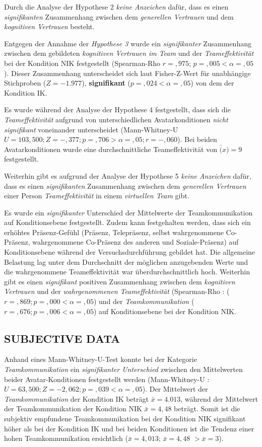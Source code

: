 \documentclass[sigchi]{acmart}
\begin{document}
Durch die Analyse der Hypothese 2 \textit{keine Anzeichen} dafür, dass es einen \textit{signifikanten} Zusammenhang zwischen dem \textit{generellen Vertrauen} und dem \textit{kognitiven Vertrauen} besteht. 

Entgegen der Annahme der \textit{Hypothese 3} wurde ein \textit{signifikanter} Zusammenhang zwischen dem gebildeten \textit{kognitiven Vertrauen im Team} und der \textit{Teameffektivität} bei der Kondition NIK festgestellt (Spearman-Rho $r =,975$; $p =,005 < \alpha = ,05$). Dieser Zusammenhang unterscheidet sich laut Fisher-Z-Wert für unabhängige Stichproben ($Z=-1.977$), \textbf{signifikant} ($p =,024 < \alpha = ,05$) von dem der Kondition IK.
 
Es wurde während der Analyse der Hypothese 4 festgestellt, dass sich die \textit{Teameffektivität} aufgrund von unterschiedlichen Avatarkonditionen \textit{nicht signifikant} voneinander unterscheidet (Mann-Whitney-U $U = 103,500; Z = -,377; p =,706 > \alpha = ,05; r = -,060$). Bei beiden Avatarkonditionen wurde eine durchschnittliche Teameffektivität von $\bar(x) = 9$ festgestellt.

Weiterhin gibt es aufgrund der Analyse der Hypothese 5 \textit{keine Anzeichen} dafür, dass es einen \textit{signifikanten} Zusammenhang zwischen dem \textit{generellen Vertrauen} einer Person \textit{Teameffektivität} in einem \textit{virtuellen Team} gibt.

Es wurde ein \textit{signifikanter} Unterschied der Mittelwerte der Teamkommunikation auf Konditionsebene festgestellt. Zudem kann festgehalten werden, dass sich ein erhöhtes Präsenz-Gefühl (Präsenz, Telepräsenz, selbst wahrgenommene Co-Präsenz, wahrgenommene Co-Präsenz des anderen und Soziale-Präsenz) auf Konditionsebene während der Versuchsdurchführung gebildet hat. Die allgemeine Belastung lag unter dem Durchschnitt der möglichen anzugebenden Werte und die wahrgenommene Teameffektivität war überdurchschnittlich hoch.
Weiterhin gibt es einen \textit{signifikant} positiven Zusammenhang zwischen dem \textit{kognitiven Vertrauen} und der \textit{wahrgenommenen Teameffektivität}  (Spearman-Rho : ($r =,869; p =,000 < \alpha = ,05$) und der \textit{Teamkommunikation} ($r =,676; p =,006 < \alpha = ,05$) auf Konditionsebene bei der Kondition NIK.

\subsection{SUBJECTIVE DATA}
Anhand eines Mann-Whitney-U-Test konnte bei der Kategorie \textit{Teamkommunikation} ein \textit{signifikanter Unterschied} zwischen den Mittelwerten beider Avatar-Konditionen festgestellt werden (Mann-Whitney-U : $U = 63,500; Z = -2,062; p =,039 < \alpha = ,05$). Der Mittelwert der \textit{Teamkommunikation} der Kondition IK beträgt $\bar{x} = 4.013$, während der Mittelwert der Teamkommunikation der Kondition NIK $\bar{x} = 4,48$ beträgt. Somit ist die subjektiv empfundene Teamkommunikation bei der Kondition NIK signifikant höher als bei der Kondition IK und bei beiden Konditionen ist die Tendenz einer hohen Teamkommunikation ersichtlich ($\bar{x} = 4,013$; $\bar{x} = 4,48$ $ > \bar{x}  = 3$).
\end{document}
